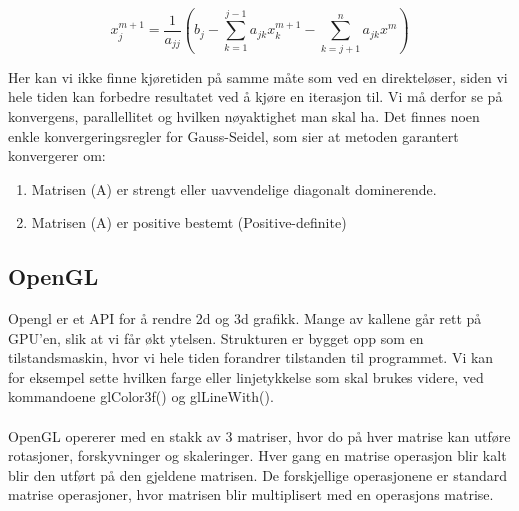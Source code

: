 \documentclass[10pt,a4paper, norsk]{article}
\begin{document}
 \begin{equation} \label{seideliterater}
   x_j^{m+1} = \frac{1}{a_{jj}}  (b_j - \sum_{k=1}^{j-1} a_{jk} x_k^{m+1} - \sum_{k=j+1}^n a_{jk}x^m)
 \end{equation}

Her kan vi ikke finne kjøretiden på samme måte som ved en direkteløser, siden vi hele tiden kan forbedre resultatet ved å kjøre en iterasjon til. Vi må derfor se på konvergens, parallellitet og hvilken nøyaktighet man skal ha. Det finnes noen enkle konvergeringsregler for Gauss-Seidel, som sier at metoden garantert konvergerer om:
\begin{enumerate}
\item Matrisen (A) er strengt eller uavvendelige diagonalt dominerende.
\item Matrisen (A) er positive bestemt (Positive-definite)
\end{enumerate}



\subsection{OpenGL}
Opengl er et API for å rendre 2d og 3d grafikk. Mange av kallene går rett på GPU'en, slik at vi får økt ytelsen. Strukturen er bygget opp som en tilstandsmaskin, hvor vi hele tiden forandrer tilstanden til programmet. Vi kan for eksempel sette hvilken farge eller linjetykkelse som skal brukes videre, ved kommandoene glColor3f() og glLineWith().

\paragraph{}
OpenGL opererer med en stakk av 3 matriser, hvor do på hver matrise kan utføre rotasjoner, forskyvninger og skaleringer. Hver gang en matrise operasjon blir kalt blir den utført på den gjeldene matrisen. De forskjellige operasjonene er standard matrise operasjoner, hvor matrisen blir multiplisert med en operasjons matrise.
\end{document}
